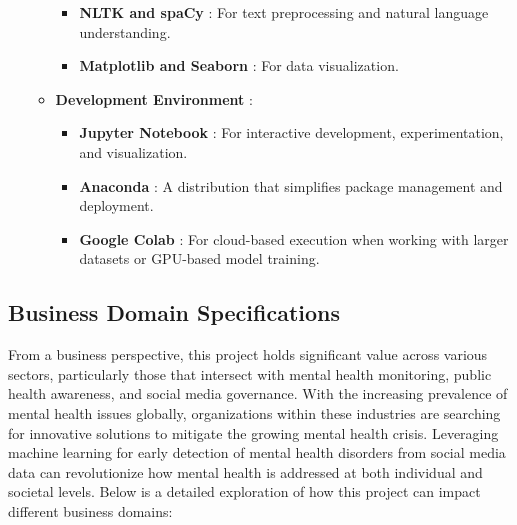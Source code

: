 \begin{itemize}
\begin{itemize}
\begin{itemize}
                    \item \textbf{NLTK and spaCy} :
                    \noindent
                    For text preprocessing and natural language understanding.

                    \item \textbf{Matplotlib and Seaborn} :
                    \noindent
                    For data visualization.
                    
                \end{itemize}

            \item \textbf{Development Environment} :
            \noindent
                \begin{itemize}
                    
                    \item \textbf{Jupyter Notebook} :
                    \noindent
                    For interactive development, experimentation, and visualization.

                    \item \textbf{Anaconda} :
                    \noindent
                    A distribution that simplifies package management and deployment.

                    \item \textbf{Google Colab} :
                    \noindent
                    For cloud-based execution when working with larger datasets or GPU-based model training.
                
                \end{itemize}
                
        \end{itemize}
    
\end{itemize}

\subsection{Business Domain Specifications}
\noindent
From a business perspective, this project holds significant value across various sectors, particularly those that intersect with mental health monitoring, public health awareness, and social media governance. With the increasing prevalence of mental health issues globally, organizations within these industries are searching for innovative solutions to mitigate the growing mental health crisis. Leveraging machine learning for early detection of mental health disorders from social media data can revolutionize how mental health is addressed at both individual and societal levels. Below is a detailed exploration of how this project can impact different business domains:

